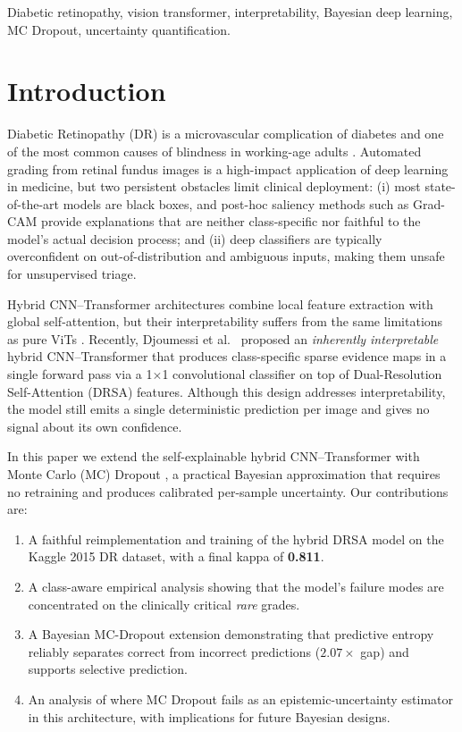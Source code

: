 \documentclass[conference]{IEEEtran}
\begin{document}
\begin{IEEEkeywords}
Diabetic retinopathy, vision transformer, interpretability, Bayesian deep learning, MC Dropout, uncertainty quantification.
\end{IEEEkeywords}

\section{Introduction}

Diabetic Retinopathy (DR) is a microvascular complication of diabetes and one of the most common causes of blindness in working-age adults \cite{flaxman2017global}. Automated grading from retinal fundus images is a high-impact application of deep learning in medicine, but two persistent obstacles limit clinical deployment: (i) most state-of-the-art models are black boxes, and post-hoc saliency methods such as Grad-CAM \cite{selvaraju2017gradcam} provide explanations that are neither class-specific nor faithful to the model's actual decision process; and (ii) deep classifiers are typically overconfident on out-of-distribution and ambiguous inputs, making them unsafe for unsupervised triage.

Hybrid CNN--Transformer architectures \cite{ilyas2024hybrid} combine local feature extraction with global self-attention, but their interpretability suffers from the same limitations as pure ViTs \cite{dosovitskiy2020vit}. Recently, Djoumessi et al.\ \cite{djoumessi2025hybrid} proposed an \emph{inherently interpretable} hybrid CNN--Transformer that produces class-specific sparse evidence maps in a single forward pass via a 1$\times$1 convolutional classifier on top of Dual-Resolution Self-Attention (DRSA) features. Although this design addresses interpretability, the model still emits a single deterministic prediction per image and gives no signal about its own confidence.

In this paper we extend the self-explainable hybrid CNN--Transformer with Monte Carlo (MC) Dropout \cite{gal2016dropout}, a practical Bayesian approximation that requires no retraining and produces calibrated per-sample uncertainty. Our contributions are:
\begin{enumerate}
    \item A faithful reimplementation and training of the hybrid DRSA model on the Kaggle 2015 DR dataset, with a final kappa of \textbf{0.811}.
    \item A class-aware empirical analysis showing that the model's failure modes are concentrated on the clinically critical \emph{rare} grades.
    \item A Bayesian MC-Dropout extension demonstrating that predictive entropy reliably separates correct from incorrect predictions ($2.07\times$ gap) and supports selective prediction.
    \item An analysis of where MC Dropout fails as an epistemic-uncertainty estimator in this architecture, with implications for future Bayesian designs.
\end{enumerate}
\end{document}
